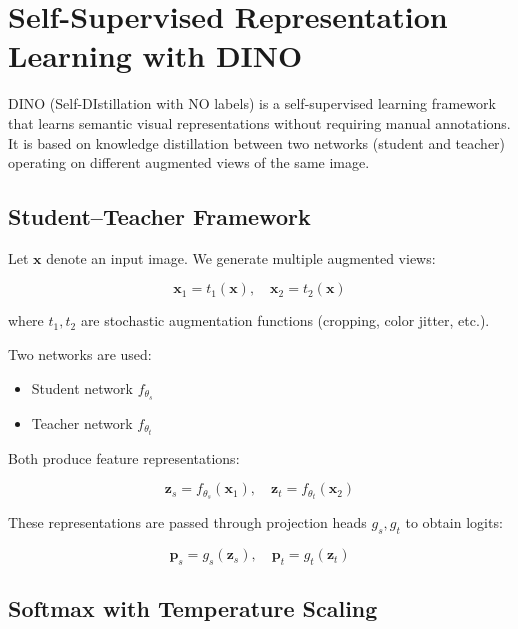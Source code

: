 \section{Self-Supervised Representation Learning with DINO}
\label{sec:dino_theory}

DINO (Self-DIstillation with NO labels) is a self-supervised learning framework that learns semantic visual representations without requiring manual annotations. It is based on knowledge distillation between two networks (student and teacher) operating on different augmented views of the same image.

\subsection{Student–Teacher Framework}

Let $\mathbf{x}$ denote an input image. We generate multiple augmented views:

\begin{equation}
\mathbf{x}_1 = t_1(\mathbf{x}), \quad
\mathbf{x}_2 = t_2(\mathbf{x})
\end{equation}

where $t_1, t_2$ are stochastic augmentation functions (cropping, color jitter, etc.).

Two networks are used:

\begin{itemize}
    \item Student network $f_{\theta_s}$
    \item Teacher network $f_{\theta_t}$
\end{itemize}

Both produce feature representations:

\begin{equation}
\mathbf{z}_s = f_{\theta_s}(\mathbf{x}_1), \quad
\mathbf{z}_t = f_{\theta_t}(\mathbf{x}_2)
\end{equation}

These representations are passed through projection heads $g_s, g_t$ to obtain logits:

\begin{equation}
\mathbf{p}_s = g_s(\mathbf{z}_s), \quad
\mathbf{p}_t = g_t(\mathbf{z}_t)
\end{equation}

\subsection{Softmax with Temperature Scaling}

